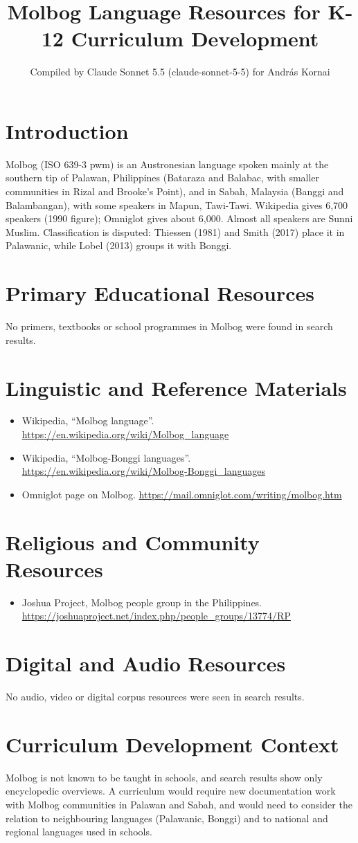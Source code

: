 \documentclass[12pt]{article}
\title{Molbog Language Resources for K-12 Curriculum Development}
\author{Compiled by Claude Sonnet 5.5 (claude-sonnet-5-5) for Andr\'as Kornai}
\date{}
\begin{document}
\maketitle

\section{Introduction}
Molbog (ISO 639-3 pwm) is an Austronesian language spoken mainly at the southern tip of Palawan, Philippines (Bataraza and Balabac, with smaller communities in Rizal and Brooke's Point), and in Sabah, Malaysia (Banggi and Balambangan), with some speakers in Mapun, Tawi-Tawi. Wikipedia gives 6,700 speakers (1990 figure); Omniglot gives about 6,000. Almost all speakers are Sunni Muslim. Classification is disputed: Thiessen (1981) and Smith (2017) place it in Palawanic, while Lobel (2013) groups it with Bonggi.

\section{Primary Educational Resources}
No primers, textbooks or school programmes in Molbog were found in search results.

\section{Linguistic and Reference Materials}
\begin{itemize}
\item Wikipedia, ``Molbog language''. \url{https://en.wikipedia.org/wiki/Molbog_language}
\item Wikipedia, ``Molbog-Bonggi languages''. \url{https://en.wikipedia.org/wiki/Molbog-Bonggi_languages}
\item Omniglot page on Molbog. \url{https://mail.omniglot.com/writing/molbog.htm}
\end{itemize}

\section{Religious and Community Resources}
\begin{itemize}
\item Joshua Project, Molbog people group in the Philippines. \url{https://joshuaproject.net/index.php/people_groups/13774/RP}
\end{itemize}

\section{Digital and Audio Resources}
No audio, video or digital corpus resources were seen in search results.

\section{Curriculum Development Context}
Molbog is not known to be taught in schools, and search results show only encyclopedic overviews. A curriculum would require new documentation work with Molbog communities in Palawan and Sabah, and would need to consider the relation to neighbouring languages (Palawanic, Bonggi) and to national and regional languages used in schools.
\end{document}
